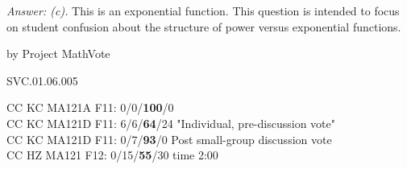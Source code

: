 {\it Answer: (c).}
This is an exponential function.  This question is intended to focus on student confusion about the structure of power versus exponential functions.

\medskip

by Project MathVote

SVC.01.06.005

CC KC MA121A F11: 0/0/{\bf100}/0  \\
CC KC MA121D F11: 6/6/{\bf64}/24 "Individual, pre-discussion vote" \\
CC KC MA121D F11: 0/7/{\bf93}/0 Post small-group discussion vote \\
CC HZ MA121 F12: 0/15/{\bf55}/30 time 2:00  \\

